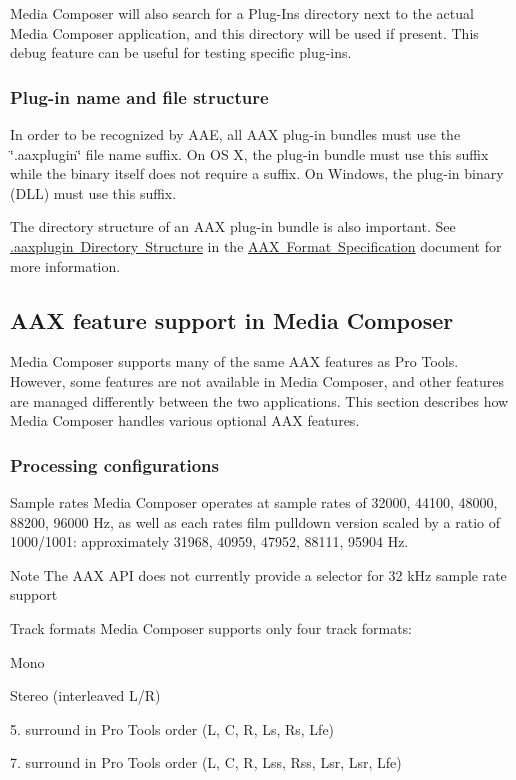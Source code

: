 Media Composer will also search for a Plug-\/\+Ins directory next to the actual Media Composer application, and this directory will be used if present. This debug feature can be useful for testing specific plug-\/ins.

\hypertarget{a00831_subsection__media_composer_guide__file_name}{}\subsubsection{Plug-\/in name and file structure}\label{a00831_subsection__media_composer_guide__file_name}
 In order to be recognized by A\+AE, all A\+AX plug-\/in bundles must use the \char`\"{}.\+aaxplugin\char`\"{} file name suffix. On OS X, the plug-\/in bundle must use this suffix while the binary itself does not require a suffix. On Windows, the plug-\/in binary (D\+LL) must use this suffix.

The directory structure of an A\+AX plug-\/in bundle is also important. See \mbox{\hyperlink{a00801_commoninterface_formatspecification__aaxplugin_directory_structure}{.aaxplugin Directory Structure}} in the \mbox{\hyperlink{a00801}{A\+AX Format Specification}} document for more information.



 \hypertarget{a00831_aax_media_composer_guide__features}{}\subsection{A\+A\+X feature support in Media Composer}\label{a00831_aax_media_composer_guide__features}
 Media Composer supports many of the same A\+AX features as Pro Tools. However, some features are not available in Media Composer, and other features are managed differently between the two applications. This section describes how Media Composer handles various optional A\+AX features.

\hypertarget{a00831_subsection__aax_media_composer_guide__features__processing}{}\subsubsection{Processing configurations}\label{a00831_subsection__aax_media_composer_guide__features__processing}
 Sample rates Media Composer operates at sample rates of 32000, 44100, 48000, 88200, 96000 Hz, as well as each rate\textquotesingle{}s film pulldown version scaled by a ratio of 1000/1001\+: approximately 31968, 40959, 47952, 88111, 95904 Hz.

\begin{DoxyNote}{Note}
The A\+AX A\+PI does not currently provide a selector for 32 k\+Hz sample rate support
\end{DoxyNote}
Track formats Media Composer supports only four track formats\+: 
\begin{DoxyItemize}
\item Mono 
\item Stereo (interleaved L/R)  
\item 5. surround in Pro Tools order (L, C, R, Ls, Rs, Lfe)  
\item 7. surround in Pro Tools order (L, C, R, Lss, Rss, Lsr, Lsr, Lfe)  
\end{DoxyItemize}

